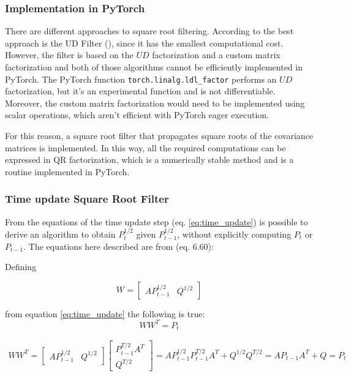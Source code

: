 \documentclass{article}
\begin{document}
\subsubsection{Implementation in PyTorch}

There are different approaches to square root filtering. According to \cite{mohinder_s_grewal_kalman_2001} the best approach is the UD Filter (\cite{bierman_numerical_1977}), since it has the smallest computational cost. However, the filter is based on the $UD$ factorization and a custom matrix factorization \cite{mohinder_s_grewal_kalman_2001} and both of those algorithms cannot be efficiently implemented in PyTorch. The PyTorch function \verb|torch.linalg.ldl_factor| performs an $UD$ factorization, but it's an experimental function and is not differentiable. Moreover, the custom matrix factorization would need to be implemented using scalar operations, which aren't efficient with PyTorch eager execution.

For this reason, a square root filter that propagates square roots of the covariance matrices is implemented. In this way, all the required computations can be expressed in QR factorization, which is a numerically stable method and is a routine implemented in PyTorch.

\subsubsection{Time update Square Root Filter}

From the equations of the time update step (eq. \ref{eq:time_update}) is possible to derive an algorithm to obtain $P_t^{1/2}$ given $P_{t-1}^{1/2}$, without explicitly computing $P_t$ or $P_{t-1}$. The equations here described are from \cite{mohinder_s_grewal_kalman_2001} (eq. 6.60):

Defining

\begin{equation}
    W = \begin{bmatrix}AP_{t-1}^{1/2} & Q^{1/2}\end{bmatrix}
\end{equation}

from equation \ref{eq:time_update} the following is true:
\begin{equation}\label{time_update_SR_mult}
WW^T = P_t 
\end{equation}

\begin{multline}
  WW^T =  \begin{bmatrix}AP_{t-1}^{1/2} & Q^{1/2}\end{bmatrix}\begin{bmatrix}P_{t-1}^{T/2}A^T \\ Q^{T/2}\end{bmatrix}
  = AP_{t-1}^{1/2}P_{t-1}^{T/2}A^T + Q^{1/2}Q^{T/2} = AP_{t-1}A^T + Q = P_t
\end{multline}
\end{document}
